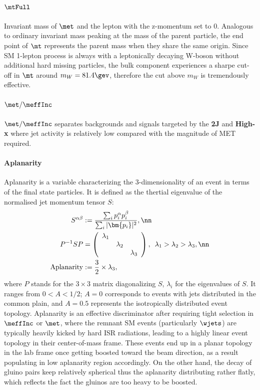 \paragraph{${\bf \mtFull}$} 
Invariant mass of $\met$ and the lepton with the z-momentum set to 0.
Analogous to ordinary invariant mass peaking at the mass of the parent particle, the end point of $\mt$ represents the parent mass when they share the same origin.
Since SM 1-lepton process is always with a leptonically decaying W-boson without additional hard missing particles, the bulk component experiences a sharpe cut-off in $\mt$ around $m_W = 81.4 \gev$, 
therefore the cut above $m_W$ is tremendously effective.


\paragraph{${\bf \met/\meffInc}$}
$\met/\meffInc$ separates backgrounds and signals targeted by the \textbf{2J} and \textbf{High-x} where jet activity is relatively low compared with the magnitude of MET required.


\paragraph{Aplanarity}
Aplanarity is a variable characterizing the 3-dimensionality of an event in terms of the final state particles. It is defined as the thertial eigenvalue of the normalised jet momentum tensor $S$:
\begin{align}
  S^{\alpha \beta} & := \frac{\sum_i p_i^{\alpha} p_i^{\beta} }{\sum_i |\bm{p_i}|^2 }, \nn \\ 
  P^{-1}SP & = \left(
  \begin{array}{c c c }
    \lambda_1  & & \\
    & \lambda_2 & \\
    & & \lambda_3 \\
  \end{array}
  \right), \,\,\, \lambda_1 > \lambda_2 > \lambda_3, \nn \\
  \mathrm{Aplanarity} & := \frac {3}{2} \times \lambda_3,
\end{align}
where $P$ stands for the $3\times3$ matrix diagonalizing $S$, $\lambda_i$ for the eigenvalues of $S$.
It ranges from $0<A<1/2$; $A=0$ corresponds to events with jets distributed in the common plain, and $A=0.5$ represents the isotropically distributed event topology.
Aplanarity is an effective discriminator after requiring tight selection in $\meffInc$ or $\met$, where the remnant SM events (particularly $\wjets$) are typically heavily kicked by hard ISR radiations, leading to a highly linear event topology in their center-of-mass frame. These events end up in a planar topology in the lab frame once getting boosted toward the beam direction, as a result populating in low aplanarity region accordingly. 
On the other hand, the decay of gluino pairs keep relatively spherical thus the aplanarity distributing rather flatly, which reflects the fact the gluinos are too heavy to be boosted.


